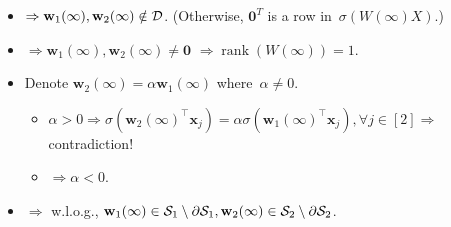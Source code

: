 \documentclass[handout,usenames,dvipsnames]{beamer} %
\DeclareMathOperator{\rank}{rank}
\newcommand{\bx}{\mathbf{x}}
\newcommand{\bw}{\mathbf{w}}
\newcommand{\cd}{{\cal D}}
\newcommand{\cs}{{\cal S}}
\newcommand{\zero}{{\mathbf{0}}}
\begin{document}
\begin{frame}
    \begin{itemize}
        \pause
        \item $\Rightarrow \bw_1(\infty), \bw_2(\infty) \notin \cd$. (Otherwise, $\zero^T$ is a row in~$\sigma(W(\infty) X)$.)
        \pause
        \item $\Rightarrow \bw_1(\infty), \bw_2(\infty) \ne \zero$ $\Rightarrow \rank(W(\infty))=1$. 
        \pause
        \item Denote $\bw_2(\infty) = \alpha \bw_1(\infty)$ where~$\alpha \neq 0$.
        \pause
        \begin{itemize}
            \item $\alpha > 0 \Rightarrow \sigma(\bw_2(\infty)^\top \bx_j) = \alpha \sigma(\bw_1(\infty)^\top \bx_j), \forall j \in [2] \Rightarrow$ contradiction!
            \item $\Rightarrow \alpha < 0$.
        \end{itemize}
        \pause
        \item $\Rightarrow$ w.l.o.g., $\bw_1(\infty) \in \cs_1 \setminus \partial \cs_1, \bw_2(\infty) \in \cs_2 \setminus \partial \cs_2$.
    \end{itemize}
    

\end{frame}
\end{document}
